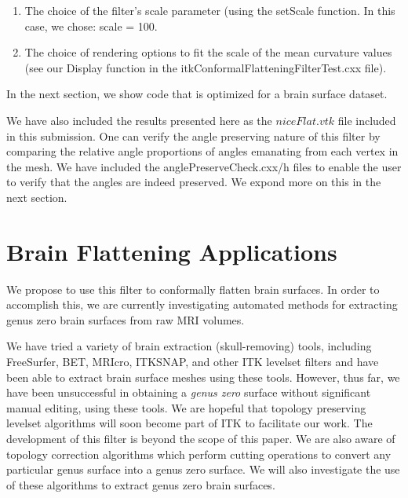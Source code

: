 \documentclass{InsightArticle}
\begin{document}
  \begin{enumerate}
  \item The choice of the filter's scale parameter (using the setScale
  function. In this case, we chose: scale = 100.
  \item The choice of rendering options to fit the scale of the mean
  curvature values (see our Display function in the
  itkConformalFlatteningFilterTest.cxx file).
  \end{enumerate}

  \noindent In the next section, we show code that is
  optimized for a brain surface dataset.

  We have also included the results presented here as the
  $niceFlat.vtk$ file included in this submission. One can verify the
  angle preserving nature of this filter by comparing the relative
  angle proportions of angles emanating from each vertex in the
  mesh. We have included the anglePreserveCheck.cxx/h files to
  enable the user to verify that the angles are indeed preserved. We
  expond more on this in the next section.

	\section{Brain Flattening Applications}
  \label{sec:brain-flat}
  We propose to use this filter to conformally flatten brain
  surfaces. In order to accomplish this, we are currently
  investigating automated methods for extracting genus zero brain
  surfaces from raw MRI volumes.

  We have tried a variety of brain extraction (skull-removing) tools,
  including FreeSurfer, BET, MRIcro, ITKSNAP, and other ITK levelset
  filters and have been able to extract brain surface meshes using
  these tools. However, thus far, we have been unsuccessful in
  obtaining a \emph{genus zero} surface without significant manual
  editing, using these tools. We are hopeful that topology preserving
  levelset algorithms will soon become part of ITK to facilitate our
  work. The development of this filter is beyond the scope of this
  paper. We are also aware of topology correction algorithms which
  perform cutting operations to convert any particular genus surface
  into a genus zero surface. We will also investigate the use of these
  algorithms to extract genus zero brain surfaces.
\end{document}
